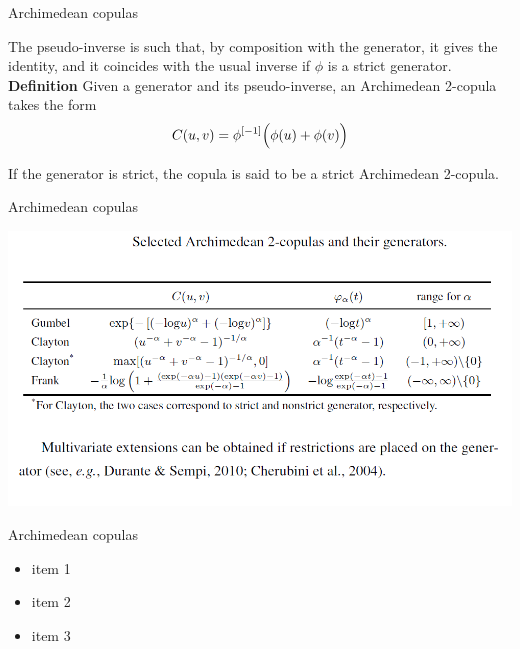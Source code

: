 \documentclass[11pt]{beamer}
\theoremstyle{plain}
\theoremstyle{definition}
\theoremstyle{remark}
\begin{document}
%
\begin{frame}{Archimedean copulas}


The pseudo-inverse is such that, by composition with the generator, it gives the identity, and it coincides with the usual      
	inverse if $\phi$ is a strict generator. \\[2ex]

\noindent\textbf{Definition} Given a generator and its pseudo-inverse, an Archimedean 2-copula takes the form
\begin{equation}
C(u, v) = \phi^{[-1]}\Bigl( \phi(u) + \phi(v) \Bigr)
\end{equation}

If the generator is strict, the copula is said to be a strict Archimedean 2-copula.				  						  

\end{frame}
%
\begin{frame}{Archimedean copulas}
\begin{center}
\includegraphics[scale=.45]{fig/copule_archimedee_tabella.PNG} 
\end{center}
\end{frame}
%
\begin{frame}{Archimedean copulas}
   \begin{itemize}
      \item   				  						  
		item 1 
	  \item item 2
\item item 3
   \end{itemize}
\end{frame}
\end{document}
